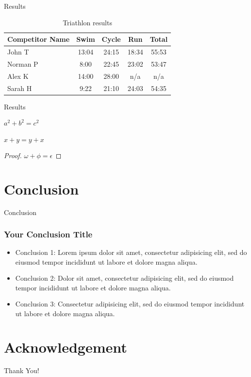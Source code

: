 \documentclass[10pt]{beamer}
\begin{document}
\begin{frame}{Results}
    \begin{table}
        \begin{tabular}{l | c | c | c | c }
        Competitor Name & Swim & Cycle & Run & Total \\
        \hline \hline
        John T & 13:04 & 24:15 & 18:34 & 55:53 \\ 
        Norman P & 8:00 & 22:45 & 23:02 & 53:47\\
        Alex K & 14:00 & 28:00 & n/a & n/a\\
        Sarah H & 9:22 & 21:10 & 24:03 & 54:35 
        \end{tabular}
        \caption{Triathlon results}
    \end{table}
\end{frame}

\begin{frame}{Results}
    \begin{theorem}[Pythagoras] 
      $ a^2 + b^2 = c^2$
    \end{theorem}
    \begin{corollary}
     $ x + y = y + x  $
    \end{corollary}
    \begin{proof}
     $\omega +\phi = \epsilon $
    \end{proof}
\end{frame}


\section{Conclusion}

\begin{frame}{Conclusion}
    \frametitle{Your Conclusion Title}
	\begin{itemize}
	    \item Conclusion 1: Lorem ipsum dolor sit amet, consectetur adipisicing elit, sed do eiusmod tempor incididunt ut labore et dolore magna aliqua.
            \item Conclusion 2: Dolor sit amet, consectetur adipisicing elit, sed do eiusmod tempor incididunt ut labore et dolore magna aliqua.
            \item Conclusion 3: Consectetur adipisicing elit, sed do eiusmod tempor incididunt ut labore et dolore magna aliqua.
	\end{itemize}
\end{frame}


\section*{Acknowledgement}  
\begin{frame}
\textcolor{ehimeColor}{\Huge{\centerline{Thank You!}}}
\end{frame}
\end{document}

